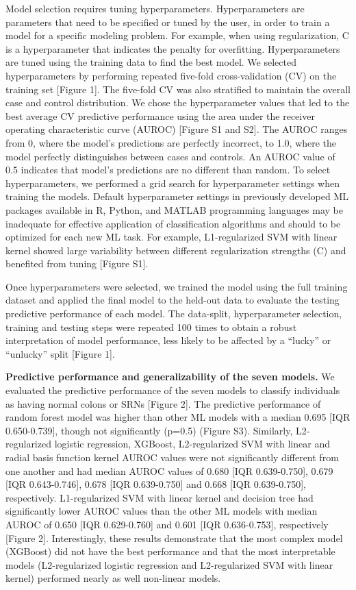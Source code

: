 \documentclass[11pt,]{article}
\begin{document}
Model selection requires tuning hyperparameters. Hyperparameters are
parameters that need to be specified or tuned by the user, in order to
train a model for a specific modeling problem. For example, when using
regularization, C is a hyperparameter that indicates the penalty for
overfitting. Hyperparameters are tuned using the training data to find
the best model. We selected hyperparameters by performing repeated
five-fold cross-validation (CV) on the training set {[}Figure 1{]}. The
five-fold CV was also stratified to maintain the overall case and
control distribution. We chose the hyperparameter values that led to the
best average CV predictive performance using the area under the receiver
operating characteristic curve (AUROC) {[}Figure S1 and S2{]}. The AUROC
ranges from 0, where the model's predictions are perfectly incorrect, to
1.0, where the model perfectly distinguishes between cases and controls.
An AUROC value of 0.5 indicates that model's predictions are no
different than random. To select hyperparameters, we performed a grid
search for hyperparameter settings when training the models. Default
hyperparameter settings in previously developed ML packages available in
R, Python, and MATLAB programming languages may be inadequate for
effective application of classification algorithms and should to be
optimized for each new ML task. For example, L1-regularized SVM with
linear kernel showed large variability between different regularization
strengths (C) and benefited from tuning {[}Figure S1{]}.

Once hyperparameters were selected, we trained the model using the full
training dataset and applied the final model to the held-out data to
evaluate the testing predictive performance of each model. The
data-split, hyperparameter selection, training and testing steps were
repeated 100 times to obtain a robust interpretation of model
performance, less likely to be affected by a ``lucky'' or ``unlucky''
split {[}Figure 1{]}.

\textbf{Predictive performance and generalizability of the seven
models.} We evaluated the predictive performance of the seven models to
classify individuals as having normal colons or SRNs {[}Figure 2{]}. The
predictive performance of random forest model was higher than other ML
models with a median 0.695 {[}IQR 0.650-0.739{]}, though not
significantly (p=0.5) (Figure S3). Similarly, L2-regularized logistic
regression, XGBoost, L2-regularized SVM with linear and radial basis
function kernel AUROC values were not significantly different from one
another and had median AUROC values of 0.680 {[}IQR 0.639-0.750{]},
0.679 {[}IQR 0.643-0.746{]}, 0.678 {[}IQR 0.639-0.750{]} and 0.668
{[}IQR 0.639-0.750{]}, respectively. L1-regularized SVM with linear
kernel and decision tree had significantly lower AUROC values than the
other ML models with median AUROC of 0.650 {[}IQR 0.629-0.760{]} and
0.601 {[}IQR 0.636-0.753{]}, respectively {[}Figure 2{]}. Interestingly,
these results demonstrate that the most complex model (XGBoost) did not
have the best performance and that the most interpretable models
(L2-regularized logistic regression and L2-regularized SVM with linear
kernel) performed nearly as well non-linear models.
\end{document}
